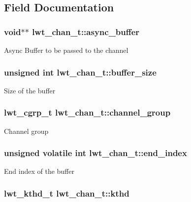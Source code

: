 \subsection{Field Documentation}
\hypertarget{structlwt__channel_a52a4a997c097ddda52e23b0bf61216e2}{
\subsubsection[{async\+\_\+buffer}]{\setlength{\rightskip}{0pt plus 5cm}void$\ast$$\ast$ lwt\+\_\+chan\+\_\+t\+::async\+\_\+buffer}}\label{structlwt__channel_a52a4a997c097ddda52e23b0bf61216e2}
Async Buffer to be passed to the channel \hypertarget{structlwt__channel_a7d896c4332bb4d47380135f3fed6aa33}{
\subsubsection[{buffer\+\_\+size}]{\setlength{\rightskip}{0pt plus 5cm}unsigned int lwt\+\_\+chan\+\_\+t\+::buffer\+\_\+size}}\label{structlwt__channel_a7d896c4332bb4d47380135f3fed6aa33}
Size of the buffer \hypertarget{structlwt__channel_a6e34c7480bc23f6ea1db12c69adec0d9}{
\subsubsection[{channel\+\_\+group}]{\setlength{\rightskip}{0pt plus 5cm}lwt\+\_\+cgrp\+\_\+t lwt\+\_\+chan\+\_\+t\+::channel\+\_\+group}}\label{structlwt__channel_a6e34c7480bc23f6ea1db12c69adec0d9}
Channel group \hypertarget{structlwt__channel_a7d50dd3c2091efb575652f445e0cee50}{
\subsubsection[{end\+\_\+index}]{\setlength{\rightskip}{0pt plus 5cm}unsigned volatile int lwt\+\_\+chan\+\_\+t\+::end\+\_\+index}}\label{structlwt__channel_a7d50dd3c2091efb575652f445e0cee50}
End index of the buffer \hypertarget{structlwt__channel_abda2a1d20a8d1231c134892c4e85ccf1}{
\subsubsection[{kthd}]{\setlength{\rightskip}{0pt plus 5cm}lwt\+\_\+kthd\+\_\+t lwt\+\_\+chan\+\_\+t\+::kthd}}\label{structlwt__channel_abda2a1d20a8d1231c134892c4e85ccf1}
